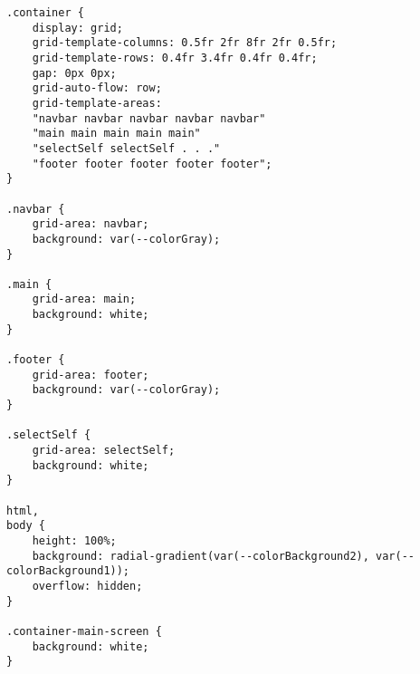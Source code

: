 \lstset{language=java}
\begin{lstlisting}[frame=tb, caption={Das Listing zeigt die CSS-Datei main-screen.component }, label={lst:main-screen.component}]
.container {
	display: grid;
	grid-template-columns: 0.5fr 2fr 8fr 2fr 0.5fr;
	grid-template-rows: 0.4fr 3.4fr 0.4fr 0.4fr;
	gap: 0px 0px;
	grid-auto-flow: row;
	grid-template-areas:
	"navbar navbar navbar navbar navbar"
	"main main main main main"
	"selectSelf selectSelf . . ."
	"footer footer footer footer footer";
}

.navbar {
	grid-area: navbar;
	background: var(--colorGray);
}

.main {
	grid-area: main;
	background: white;
}

.footer {
	grid-area: footer;
	background: var(--colorGray);
}

.selectSelf {
	grid-area: selectSelf;
	background: white;
}

html,
body {
	height: 100%;
	background: radial-gradient(var(--colorBackground2), var(--colorBackground1));
	overflow: hidden;
}

.container-main-screen {
	background: white;
}	
\end{lstlisting}
\lstset{language=java}
